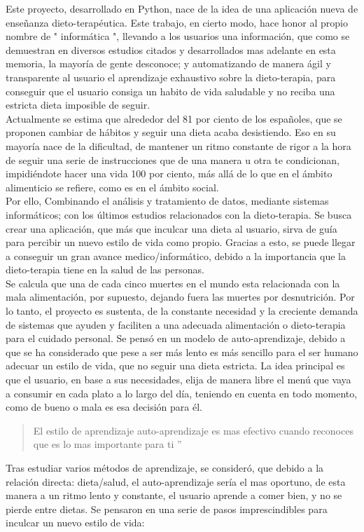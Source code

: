 
Este proyecto, desarrollado en Python, nace de la idea de una aplicación nueva de enseñanza dieto-terapéutica. Este trabajo, en cierto modo, hace honor al propio nombre de " informática ", llevando a los usuarios una información, que como se demuestran en diversos estudios citados y desarrollados mas adelante en esta memoria, la mayoría de gente desconoce; y automatizando de manera ágil y transparente al usuario el aprendizaje exhaustivo sobre la dieto-terapia, para conseguir que el usuario consiga un habito de vida saludable y no reciba una estricta dieta imposible de seguir. \\
Actualmente se estima que alrededor del 81 por ciento de los españoles, que se proponen cambiar de hábitos y seguir una dieta acaba desistiendo. Eso en su mayoría nace de la dificultad, de mantener un ritmo constante de rigor a la hora de seguir una serie de instrucciones que de una manera u otra te condicionan, impidiéndote hacer una vida 100 por ciento, más allá de lo que en el ámbito alimenticio se refiere, como es en el ámbito social. \\
Por ello, Combinando el análisis y tratamiento de datos, mediante sistemas informáticos; con los últimos estudios relacionados con la dieto-terapia. Se busca crear una aplicación, que más que inculcar una dieta al usuario, sirva de guía para percibir un nuevo estilo de vida como propio. Gracias a esto, se puede llegar a conseguir un gran avance medico/informático, debido a la importancia que la dieto-terapia tiene en la salud de las personas. \\
Se calcula que una de cada cinco muertes en el mundo esta relacionada con la mala alimentación, por supuesto, dejando fuera las muertes por desnutrición. Por lo tanto, el proyecto es sustenta, de la constante necesidad y la creciente demanda de sistemas que ayuden y faciliten a una adecuada alimentación o dieto-terapia para el cuidado personal. Se pensó en un modelo de auto-aprendizaje, debido a que se ha considerado que pese a ser más lento es más sencillo para el ser humano adecuar un estilo de vida, que no seguir una dieta estricta. La idea principal es que el usuario, en base a sus necesidades, elija de manera libre el menú que vaya a consumir en cada plato a lo largo del día, teniendo en cuenta en todo momento, como de bueno o mala es esa decisión para él. \\
\begin{quote}
El estilo de aprendizaje auto-aprendizaje es mas efectivo cuando reconoces que es lo mas importante para ti ”
\cite{autoaprendizaje}
\end{quote}
Tras estudiar varios métodos de aprendizaje, se consideró, que debido a la relación directa: dieta/salud, el auto-aprendizaje sería el mas oportuno, de esta manera a un ritmo lento y constante, el usuario aprende a comer bien, y no se pierde entre dietas.
Se pensaron en una serie de pasos imprescindibles para inculcar un nuevo estilo de vida:

